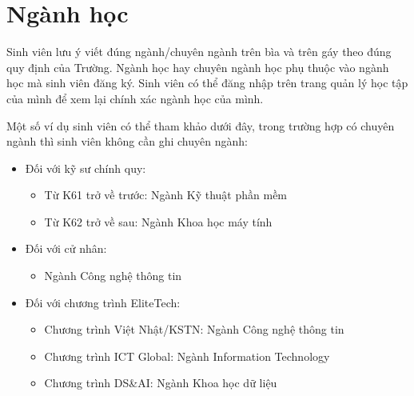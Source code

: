 \documentclass[../DoAn.tex]{subfiles}
\begin{document}
\section{Ngành học}
Sinh viên lưu ý viết đúng ngành/chuyên ngành trên bìa và trên gáy theo đúng quy định của Trường. Ngành học hay chuyên ngành học phụ thuộc vào ngành học mà sinh viên đăng ký. Sinh viên có thể đăng nhập trên trang quản lý học tập của mình để xem lại chính xác ngành học của mình. 

Một số ví dụ sinh viên có thể tham khảo dưới đây, trong trường hợp có chuyên ngành thì sinh viên không cần ghi chuyên ngành:

\begin{itemize}
\item Đối với kỹ sư chính quy:
  \begin{itemize}
  \item Từ K61 trở về trước: Ngành Kỹ thuật phần mềm
  \item Từ K62 trở về sau: Ngành Khoa học máy tính
  \end{itemize}
\item Đối với cử nhân:
  \begin{itemize}
  \item Ngành Công nghệ thông tin
  \end{itemize}
\item Đối với chương trình EliteTech:
  \begin{itemize}
  \item Chương trình Việt Nhật/KSTN: Ngành Công nghệ thông tin
  \item Chương trình ICT Global: Ngành Information Technology
  \item Chương trình DS\&AI: Ngành Khoa học dữ liệu
  \end{itemize}
\end{itemize}
\end{document}
